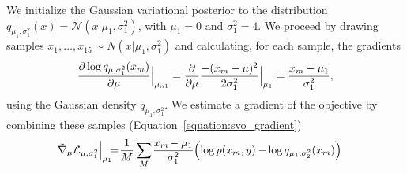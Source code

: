 We initialize the Gaussian variational posterior to the distribution
$q_{\mu_1, \sigma_1^2}(x) = \mathcal{N}(x | \mu_{1}, \sigma_{1}^2)$,
with $\mu_1=0$ and $\sigma_1^2=4$. We proceed by drawing samples $x_1,
\ldots, x_{15} \sim N(x | \mu_1, \sigma_1^2)$ and calculating, for each
sample, the gradients
\begin{align}
  \label{equation:gaussian_mean_gradient}
  \frac{\partial \log q_{\mu, \sigma_1^2}(x_m)}{\partial \mu} \Bigr|_{\mu_{n1}}
  = \frac{\partial }{\partial \mu} \frac{-(x_m - \mu)^2}{2 \sigma_1^2} \Bigr|_{\mu_{1}}
  = \frac{x_m - \mu_1}{\sigma_1^2},
\end{align}
using the Gaussian density $q_{\mu_1, \sigma_1^2}$.  We
estimate a gradient of the objective by combining these samples
(Equation~\ref{equation:svo_gradient})
\begin{align}
  {\tilde \nabla_{ \mu}{ \mathcal{L}_{\mu, \sigma_1^2}}} \Bigr|_{\mu_{1}} &
  \hspace{-5pt} = \hspace{-2pt} \frac{1}{M} \sum_M \hspace{-1pt}\frac{x_m\hspace{-1pt}-\mu_1}{\sigma^2_1}
  \hspace{-2pt} \left( \log p(x_m, y)-\hspace{-1pt} \log q_{\mu_1, \sigma_2^2}(x_m) \right) \nonumber
\end{align}

